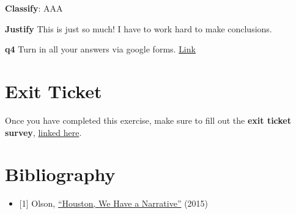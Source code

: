 \documentclass[
]{article}
\providecommand{\tightlist}{%
  \setlength{\itemsep}{0pt}\setlength{\parskip}{0pt}}
\begin{document}
\textbf{Classify}: AAA

\textbf{Justify} This is just so much! I have to work hard to make
conclusions.

\newpage

\textbf{q4} Turn in all your answers via google forms.
\href{https://forms.gle/kHuT5oufUQA7jRWG8}{Link}

\hypertarget{exit-ticket}{%
\section{Exit Ticket}\label{exit-ticket}}

Once you have completed this exercise, make sure to fill out the
\textbf{exit ticket survey},
\href{https://docs.google.com/forms/d/e/1FAIpQLSeuq2LFIwWcm05e8-JU84A3irdEL7JkXhMq5Xtoalib36LFHw/viewform?usp=pp_url\&entry.693978880=e-comm01-story-basics-assignment.Rmd}{linked
here}.

\hypertarget{bibliography}{%
\section{Bibliography}\label{bibliography}}

\begin{itemize}
\tightlist
\item
  {[}1{]} Olson, \href{http://scienceneedsstory.com/}{``Houston, We Have
  a Narrative''} (2015)
\end{itemize}
\end{document}
